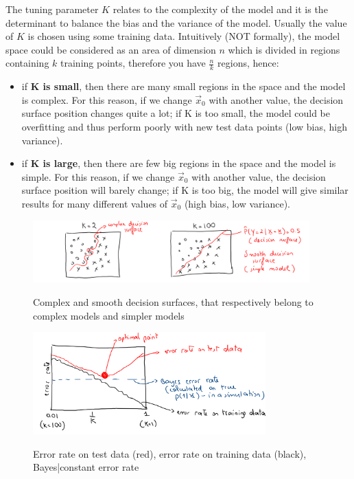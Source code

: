       The tuning parameter $K$ relates to the complexity of the model and it is
      the determinant to balance the bias and the variance of the model. Usually
      the value of $K$ is chosen using some training data. Intuitively (NOT
      formally), the model space could be considered as an area of dimension $n$
      which is divided in regions containing $k$ training points, therefore you
      have $\frac{n}{k}$ regions, hence:
      \begin{itemize}
        \item if \textbf{K is small}, then there are many small regions in the
        space and the model is complex. For this reason, if we change
        $\vec{x}_0$ with another value, the decision surface position changes
        quite a lot; if K is too small, the model could be overfitting and thus
        perform poorly with new test data points (low bias, high variance).
        \item if \textbf{K is large}, then there are few big regions in the
        space and the model is simple. For this reason, if we change $\vec{x}_0$
        with another value, the decision surface position will barely change; if
        K is too big, the model will give similar results for many different
        values of $\vec{x}_0$ (high bias, low variance).
      \end{itemize}


\begin{figure}[ht]
\caption{Complex and smooth decision surfaces, that respectively belong to complex models and simpler models}
\centering
\includegraphics[width=0.95\textwidth]{KneighbourDecisionSurf}
\label{}
\end{figure}

\begin{figure}[ht]
\caption{Error rate on test data (red), error rate on training data (black), Bayes|constant error rate}
\centering
\includegraphics[width=0.8\textwidth]{KneighbourSimpleAgainstComplex}
\label{errorRate}
\end{figure}

